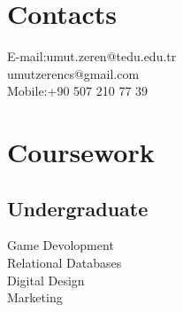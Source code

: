 \documentclass[]{deedy-resume-openfont}
\begin{document}
\begin{minipage}[t]{0.32\textwidth}
\sectionsep
\sectionsep
\sectionsep
\sectionsep


\section{Contacts}
E-mail:umut.zeren@tedu.edu.tr\\[0.1in]
umutzerencs@gmail.com \\[0.1in]
Mobile:+90 507 210 77 39
\sectionsep

\section{Coursework}

\subsection {Undergraduate}

Game Devolopment  \\[0.10in]
Relational Databases \\[0.10in]
Digital Design        \\[0.10in]
Marketing              \\[0.10in]
\sectionsep





%
%

\end{minipage} 
\hfill
\end{document}
